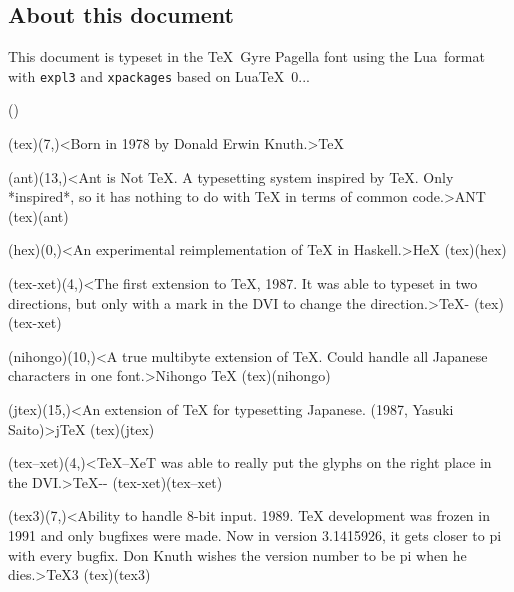 \subsection*{About this document}
This document is typeset in the \TeX\ Gyre Pagella font using the Lua\LaTeXe\ format with \verb|expl3| and \verb|xpackages| based on Lua\TeX\ 0.\the\luatexversion.\luatexrevision.



\label{sec:tree}
\Large
\centering

\label{textextview}
\tograph*({}){
	\tonode[\vip](tex)(7,\layer)<Born in 1978 by Donald Erwin Knuth.>{\TeX}
	
	\tonode[\program](ant)(13,\layer)<Ant is Not TeX. A typesetting system inspired by TeX. Only *inspired*, so it has nothing to do with TeX in terms of common code.>{ANT}
	\todraw[dotted](tex)(ant)

	\tonode[\program](hex)(0,\layer)<An experimental reimplementation of TeX in Haskell.>{HeX}
	\todraw[dotted](tex)(hex)
	
	\steplayer[-1.5]
	\tonode(tex-xet)(4,\layer)<The first extension to TeX, 1987. It was able to typeset in two directions, but only with a mark in the DVI to change the direction.>{\TeX-\XeT}
	\todraw(tex)(tex-xet)

	\tonode(nihongo)(10,\layer)<A true multibyte extension of TeX. Could handle all Japanese characters in one font.>{Nihongo \TeX}
	\todraw(tex)(nihongo)
	
	\tonode(jtex)(15,\layer)<An extension of TeX for typesetting Japanese. (1987, Yasuki Saito)>{j\TeX}
		\todraw(tex)(jtex)

	\steplayer[-2]

	\tonode(tex--xet)(4,\layer)<TeX--XeT was able to really put the glyphs on the right place in the DVI.>{\TeX-{}-\XeT}
		\todraw(tex-xet)(tex--xet)

	\tonode[\vip](tex3)(7,\layer)<Ability to handle 8-bit input. 1989. TeX development was frozen in 1991 and only bugfixes were made. Now in version 3.1415926, it gets closer to pi with every bugfix. Don Knuth wishes the version number to be pi when he dies.>{\TeX3}
		\todraw*(tex)(tex3)

	\steplayer[-1.5]

}
